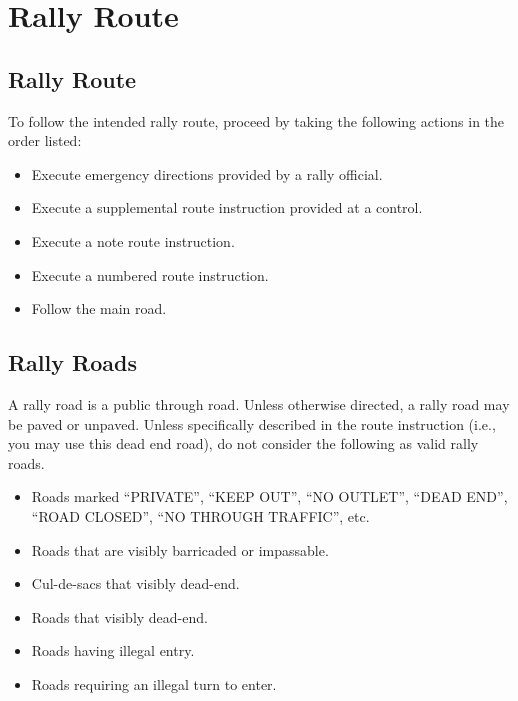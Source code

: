 \section{Rally Route}

\subsection{Rally Route}
To follow the intended rally route, proceed by taking the following actions in the order listed:

\begin{itemize}

\item Execute emergency directions provided by a rally official.

\item Execute a supplemental route instruction provided at a control.

\item Execute a note route instruction.

\item Execute a numbered route instruction.

\item Follow the main road.

\end{itemize}

\subsection{Rally Roads}
A rally road is a public through road.  Unless otherwise directed, a rally road may be paved or unpaved.  Unless specifically described in the route instruction (i.e., you may use this dead end road), do not consider the following as valid rally roads.

\begin{itemize}

\item Roads marked ``PRIVATE'', ``KEEP OUT'', ``NO OUTLET'', ``DEAD END'', ``ROAD CLOSED'', ``NO THROUGH TRAFFIC'', etc.

\item Roads that are visibly barricaded or impassable.

\item Cul-de-sacs that visibly dead-end.

\item Roads that visibly dead-end.

\item Roads having illegal entry.

\item Roads requiring an illegal turn to enter.

\end{itemize}

